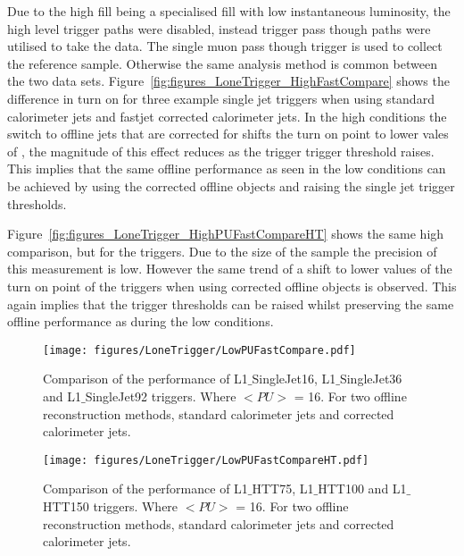 Due to the high \pu fill being a specialised fill with low instantaneous 
luminosity, the high level trigger paths were disabled, instead \Lone trigger 
pass though paths were utilised to take the data. The \Lone single muon pass 
though trigger is used to collect the reference sample. Otherwise the same 
analysis method is common between the two data sets.
Figure~\ref{fig:figures_LoneTrigger_HighFastCompare} shows the difference in 
turn on for three example \Lone single jet triggers when using standard 
calorimeter jets and fastjet corrected calorimeter jets.
In the high \pu conditions the switch to offline jets that are corrected 
for \pu shifts the turn on point to lower vales of \ET, the magnitude of 
this effect reduces as the \Lone trigger trigger threshold raises. This implies 
that the same offline performance as seen in the low \pu conditions can be 
achieved by using the \pu corrected offline objects and raising the \Lone 
single jet trigger thresholds.

Figure~\ref{fig:figures_LoneTrigger_HighPUFastCompareHT} shows the same high 
\pu comparison, but for the \Lone \HT triggers. Due to the size of the 
sample the precision of this measurement is low. However the same trend of a 
shift to lower \HT values of the turn on point of the \Lone triggers when using 
\pu corrected offline objects is observed. This again implies that the 
\Lone \HT trigger thresholds can be raised whilst preserving the same offline 
performance as during the low \pu conditions.

\begin{figure}[htbp]
  \centering
    \texttt{[image: figures/LoneTrigger/LowPUFastCompare.pdf]}
  \caption{Comparison of the performance of  L1$\_$SingleJet16, L1$\_$SingleJet36 and  L1$\_$SingleJet92 triggers. Where $<PU>$ = 16. For two offline reconstruction methods, standard \AK calorimeter jets and \pu corrected \AK calorimeter jets.}
  \label{fig:figures_LoneTrigger_LowPUFastCompare}
\end{figure}


\begin{figure}[htbp]
  \centering
    \texttt{[image: figures/LoneTrigger/LowPUFastCompareHT.pdf]}
  \caption{Comparison of the performance of L1$\_$HTT75, L1$\_$HTT100 and  L1$\_$HTT150 triggers. Where $<PU>$ = 16. For two offline reconstruction methods, standard \AK calorimeter jets and \pu corrected \AK calorimeter jets.}
  \label{fig:figures_LoneTrigger_LowPUFastCompareHT}
\end{figure}



